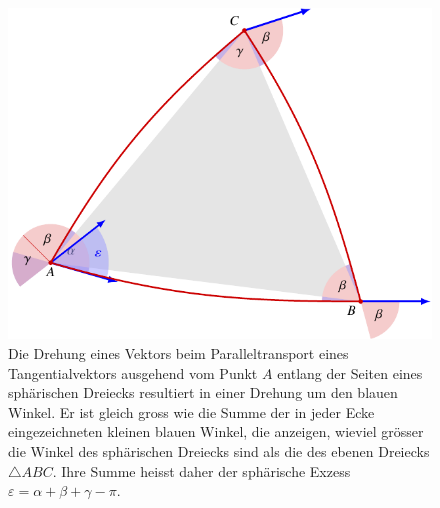 %
%
%
\begin{figure}
\centering
\includegraphics{chapters/110-kruemmung/images/drehung.pdf}
\caption{Die Drehung eines Vektors beim Paralleltransport eines
Tangentialvektors ausgehend vom Punkt $A$ entlang der Seiten eines
sphärischen Dreiecks resultiert in einer Drehung um den blauen Winkel.
Er ist gleich gross wie die Summe der in jeder Ecke eingezeichneten
kleinen blauen Winkel, die anzeigen, wieviel grösser die Winkel
des sphärischen Dreiecks sind als die des ebenen Dreiecks
$\triangle ABC$.
Ihre Summe heisst daher der sphärische Exzess
$\varepsilon = \alpha+\beta+\gamma-\pi$.
\label{buch:kruemmung:fig:drehung}}
\end{figure}
